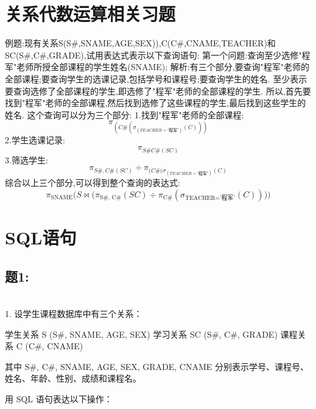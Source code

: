 \documentclass[a4paper,12pt,UTF8]{ctexart}
\begin{document}
\section{关系代数运算相关习题}
例题:现有关系S(S\#,SNAME,AGE,SEX)),C(C\#,CNAME,TEACHER)和SC(S\#,C\#,GRADE),试用表达式表示以下查询语句:
第一个问题:查询至少选修"程军"老师所授全部课程的学生姓名(SNAME);
解析:有三个部分,要查询"程军"老师的全部课程;要查询学生的选课记录,包括学号和课程号;要查询学生的姓名.
至少表示要查询选修了全部课程的学生,即选修了"程军"老师的全部课程的学生.
所以,首先要找到"程军"老师的全部课程,然后找到选修了这些课程的学生,最后找到这些学生的姓名.
这个查询可以分为三个部分:
1.找到"程军"老师的全部课程:\\
\begin{equation}
    \pi_{(C\#(\sigma_(TEACHER='\text{程军}')(C)))}
\end{equation}
2.学生选课记录:\\
\begin{equation}
    \pi_{S\# C\#(SC)}
\end{equation}
3.筛选学生:
\begin{equation}
    {\pi_{S\#,C\#(SC)}}\div{\pi_{(C\#(\sigma_(TEACHER='\text{程军}')(C)}}
\end{equation}
综合以上三个部分,可以得到整个查询的表达式:\\
\begin{equation}
    \pi_{\text{SNAME}} \Big( S \Join \big( \pi_{\text{S\#, C\#}}(SC) \div \pi_{\text{C\#}}( \sigma_{\text{TEACHER='程军'}}(C) ) \big) \Big)
\end{equation}
 
\section{SQL语句}
\subsection{题1:}\\
1. 设学生课程数据库中有三个关系：

   学生关系 S (S\#, SNAME, AGE, SEX)
    学习关系 SC (S\#, C\#, GRADE)
   课程关系 C (C\#, CNAME)

   其中 S\#, C\#, SNAME, AGE, SEX, GRADE, CNAME 分别表示学号、课程号、姓名、年龄、性别、成绩和课程名。

用 SQL 语句表达以下操作：
\end{document}
